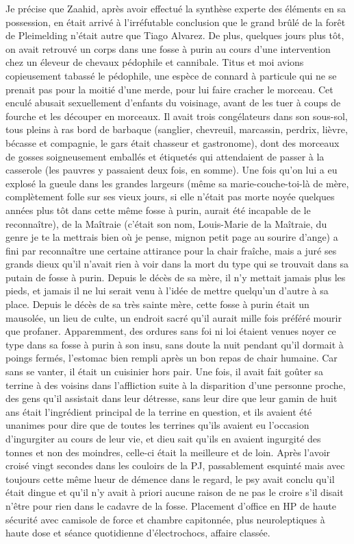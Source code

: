 Je précise que Zaahid, après avoir effectué la synthèse experte des éléments en sa possession, en était arrivé à l’irréfutable conclusion que le grand brûlé de la forêt de Pleimelding n’était autre que Tiago Alvarez. De plus, quelques jours plus tôt, on avait retrouvé un corps dans une fosse à purin au cours d’une intervention chez un éleveur de chevaux pédophile et cannibale. Titus et moi avions copieusement tabassé le pédophile, une espèce de connard à particule qui ne se prenait pas pour la moitié d’une merde, pour lui faire cracher le morceau. Cet enculé abusait sexuellement d’enfants du voisinage, avant de les tuer à coups de fourche et les découper en morceaux. Il avait trois congélateurs dans son sous-sol, tous pleins à ras bord de barbaque (sanglier, chevreuil, marcassin, perdrix, lièvre, bécasse et compagnie, le gars était chasseur et gastronome), dont des morceaux de gosses soigneusement emballés et étiquetés qui attendaient de passer à la casserole (les pauvres y passaient deux fois, en somme). Une fois qu’on lui a eu explosé la gueule dans les grandes largeurs (même sa marie-couche-toi-là de mère, complètement folle sur ses vieux jours, si elle n’était pas morte noyée quelques années plus tôt dans cette même fosse à purin, aurait été incapable de le reconnaître), de la Maîtraie (c’était son nom, Louis-Marie de la Maîtraie, du genre je te la mettrais bien où je pense, mignon petit page au sourire d’ange) a fini par reconnaître une certaine attirance pour la chair fraîche, mais a juré ses grands dieux qu’il n’avait rien à voir dans la mort du type qui se trouvait dans sa putain de fosse à purin. Depuis le décès de sa mère, il n’y mettait jamais plus les pieds, et jamais il ne lui serait venu à l’idée de mettre quelqu’un d’autre à sa place. Depuis le décès de sa très sainte mère, cette fosse à purin était un mausolée, un lieu de culte, un endroit sacré qu’il aurait mille fois préféré mourir que profaner. Apparemment, des ordures sans foi ni loi étaient venues noyer ce type dans sa fosse à purin à son insu, sans doute la nuit pendant qu’il dormait à poings fermés, l’estomac bien rempli après un bon repas de chair humaine. Car sans se vanter, il était un cuisinier hors pair. Une fois, il avait fait goûter sa terrine à des voisins dans l’affliction suite à la disparition d’une personne proche, des gens qu’il assistait dans leur détresse, sans leur dire que leur gamin de huit ans était l’ingrédient principal de la terrine en question, et ils avaient été unanimes pour dire que de toutes les terrines qu’ils avaient eu l’occasion d’ingurgiter au cours de leur vie, et dieu sait qu’ils en avaient ingurgité des tonnes et non des moindres, celle-ci était la meilleure et de loin. Après l’avoir croisé vingt secondes dans les couloirs de la PJ, passablement esquinté mais avec toujours cette même lueur de démence dans le regard, le psy avait conclu qu’il était dingue et qu’il n’y avait à priori aucune raison de ne pas le croire s’il disait n’être pour rien dans le cadavre de la fosse. Placement d’office en HP de haute sécurité avec camisole de force et chambre capitonnée, plus neuroleptiques à haute dose et séance quotidienne d’électrochocs, affaire classée.

